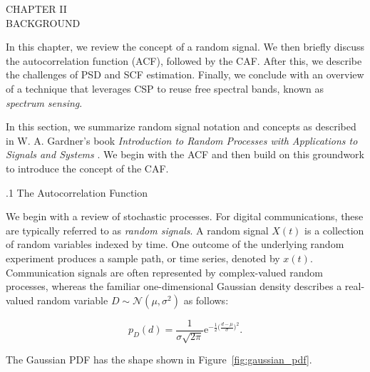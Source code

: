 \newpage
{}
\begin{center}
  \vspace*{1.65in}
  CHAPTER II\\
  BACKGROUND
\end{center}

\bigskip
In this chapter, we review the concept of a random signal.  We then briefly discuss the autocorrelation function (ACF), followed by the CAF.  After this, we describe the challenges of PSD and SCF estimation.  Finally, we conclude with an overview of a technique that leverages CSP to reuse free spectral bands, known as \textit{spectrum sensing}.


In this section, we summarize random signal notation and concepts as described in W. A. Gardner's book \textit{Introduction to Random Processes with Applications to Signals and Systems} \cite{gardner-90}.  We begin with the ACF and then build on this groundwork to introduce the concept of the CAF.

%
%
\smallskip
{}
.1 \quad The Autocorrelation Function

We begin with a review of stochastic processes.  For digital communications, these are typically referred to as \textit{random signals}.  A random signal $X(t)$ is a collection of random variables indexed by time.  One outcome of the underlying random experiment produces a sample path, or time series, denoted by $x(t)$.  Communication signals are often represented by complex-valued random processes, whereas the familiar one-dimensional Gaussian density describes a real-valued random variable $D\sim\mathcal{N}(\mu,\sigma^{2})$ as follows:

\begin{equation}\label{eq:gaussian_pdf}
p_{D}(d) =\frac{1}{\sigma \sqrt{2 \pi}} \mathrm{e}^{-\frac{1}{2} \big(\frac{d-\mu}{\sigma} \big)^{2}}.
\end{equation}

The Gaussian PDF has the shape shown in Figure~\ref{fig:gaussian_pdf}.

